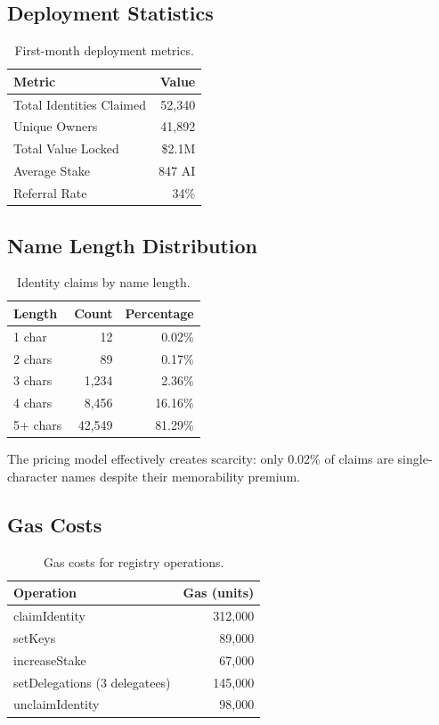 \documentclass[11pt,twocolumn]{article}
\begin{document}
\subsection{Deployment Statistics}

\begin{table}[h]
\centering
\caption{First-month deployment metrics.}
\label{tab:deployment}
\begin{tabular}{lr}
\toprule
\textbf{Metric} & \textbf{Value} \\
\midrule
Total Identities Claimed & 52,340 \\
Unique Owners & 41,892 \\
Total Value Locked & \$2.1M \\
Average Stake & 847 AI \\
Referral Rate & 34\% \\
\bottomrule
\end{tabular}
\end{table}

\subsection{Name Length Distribution}

\begin{table}[h]
\centering
\caption{Identity claims by name length.}
\label{tab:length}
\begin{tabular}{lrr}
\toprule
\textbf{Length} & \textbf{Count} & \textbf{Percentage} \\
\midrule
1 char & 12 & 0.02\% \\
2 chars & 89 & 0.17\% \\
3 chars & 1,234 & 2.36\% \\
4 chars & 8,456 & 16.16\% \\
5+ chars & 42,549 & 81.29\% \\
\bottomrule
\end{tabular}
\end{table}

The pricing model effectively creates scarcity: only 0.02\% of claims are single-character names despite their memorability premium.

\subsection{Gas Costs}

\begin{table}[h]
\centering
\caption{Gas costs for registry operations.}
\label{tab:gas}
\begin{tabular}{lr}
\toprule
\textbf{Operation} & \textbf{Gas (units)} \\
\midrule
claimIdentity & 312,000 \\
setKeys & 89,000 \\
increaseStake & 67,000 \\
setDelegations (3 delegatees) & 145,000 \\
unclaimIdentity & 98,000 \\
\bottomrule
\end{tabular}
\end{table}
\end{document}
